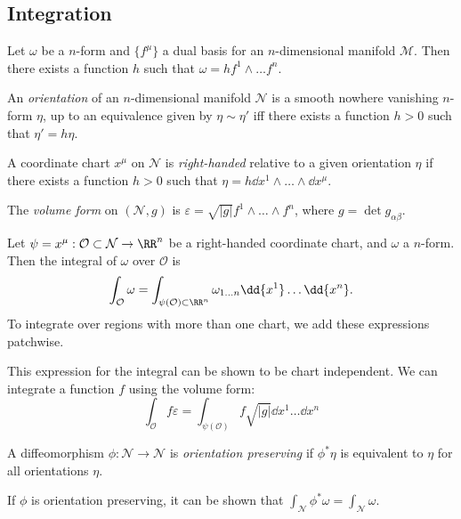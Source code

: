 \documentclass{jknotes}
\begin{document}
\subsection{Integration}
\begin{lemma}
    Let \(\omega\) be a \(n\)-form and \(\{f^\mu\}\) a dual basis for an \(n\)-dimensional manifold \(\mathcal{M}\). Then there exists a function \(h\) such that \(\omega = hf^1\wedge\dots f^n\).
\end{lemma}
\begin{defn}
    An \emph{orientation} of an \(n\)-dimensional manifold \(\mathcal{N}\) is a smooth nowhere vanishing \(n\)-form \(\eta\), up to an equivalence given by \(\eta\sim\eta'\) iff there exists a function \(h>0\) such that \(\eta' = h\eta\).
\end{defn}
\begin{defn}
    A coordinate chart \(x^\mu\) on \(\mathcal{N}\) is \emph{right-handed} relative to a given orientation \(\eta\) if there exists a function \(h>0\) such that \(\eta = h\dd{x^1}\wedge\dots\wedge\dd{x^\mu}\).
\end{defn}
\begin{defn}
    The \emph{volume form} on \((\mathcal{N},g)\) is \(\varepsilon = \sqrt{|g|}f^1\wedge\dots\wedge f^n\), where \(g=\det{g_{\alpha\beta}}\).
\end{defn}
\begin{defn}
    Let \(\psi = x^\mu:\mathcal{O}\subset\mathcal{N}\to\RR^n\) be a right-handed coordinate chart, and \(\omega\) a \(n\)-form. Then the integral of \(\omega\) over \(\mathcal{O}\) is
    \begin{equation}
        \int_{\mathcal{O}}\omega = \int_{\psi(\mathcal{O})\subset\RR^n}\omega_{1\dots n} \dd{x^1}\dots\dd{x^n}.
    \end{equation}
    To integrate over regions with more than one chart, we add these expressions patchwise.
\end{defn}
This expression for the integral can be shown to be chart independent. We can integrate a function \(f\) using the volume form:
\begin{equation}
    \int_{\mathcal{O}} f\varepsilon = \int_{\psi(\mathcal{O})}f\sqrt{|g|}\dd{x^1}\dots\dd{x^n}
\end{equation}
\begin{defn}
    A diffeomorphism \(\phi:\mathcal{N}\to\mathcal{N}\) is \emph{orientation preserving} if \(\phi^*\eta\) is equivalent to \(\eta\) for all orientations \(\eta\).
\end{defn}
If \(\phi\) is orientation preserving, it can be shown that \(\int_{\mathcal{N}}\phi^*\omega=\int_{\mathcal{N}}\omega\).
\end{document}
